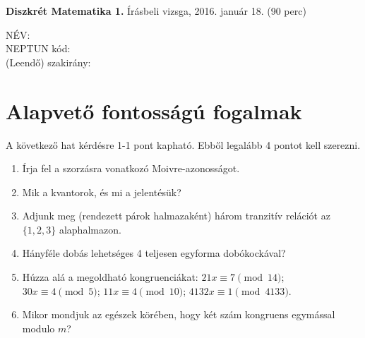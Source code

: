 \documentclass[11pt,a4paper]{article}
\begin{document}
\thispagestyle{empty}

\begin{center}
\begin{large}
\noindent \textbf{Diszkrét Matematika 1.} Írásbeli vizsga, 2016. január 18. (90 perc)
\end{large}
\end{center}

{\noindent NÉV: \\ NEPTUN kód:\\ (Leendő) szakirány:\\}
\section{Alapvető fontosságú fogalmak}
A következő hat kérdésre 1-1 pont kapható. Ebből legalább 4 pontot kell szerezni.
\begin{enumerate}\setlength{\itemsep}{3cm}

\item Írja fel a szorzásra vonatkozó Moivre-azonosságot. \vspace{-.5cm}
\item Mik a kvantorok, és mi a jelentésük?
\item Adjunk meg (rendezett párok halmazaként) három tranzitív relációt az $\{1, 2, 3\}$ alaphalmazon.
\item Hányféle dobás lehetséges 4 teljesen egyforma dobókockával?
\item Húzza alá a megoldható kongruenciákat: $21x\equiv 7\pmod 14$;  $30x\equiv 4\pmod 5$;  $11x\equiv 4\pmod {10}$;  $4132x\equiv 1\pmod {4133}.$\vspace{-1.5cm}
\item Mikor mondjuk az egészek körében, hogy két szám kongruens egymással modulo $m$?
\end{enumerate}

\newpage
\end{document}
